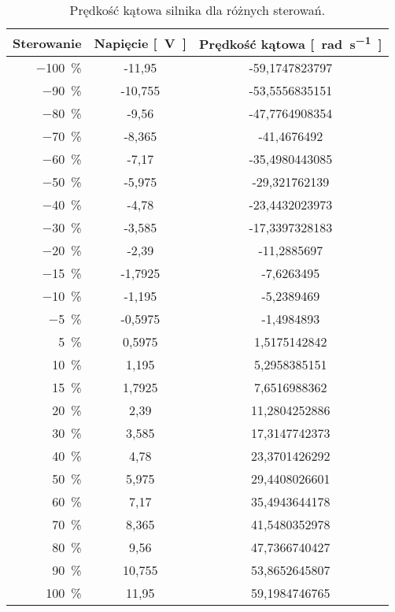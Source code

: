 \begin{table}[H]
    \centering
    \begin{threeparttable}
        \caption{Prędkość kątowa silnika dla różnych sterowań.}
        \label{tab:predkosc_silnika_rozne_sterowania}
        
        \begin{tabularx}{0.7\textwidth}{r | S[round-mode=places, round-precision=3] | S[round-mode=places, round-precision=2]}
            \toprule
            {Sterowanie} & {Napięcie \si{[\volt]}} & {Prędkość kątowa \si{[\radian\per\second]}} \\
            \midrule
            \SI{-100}{\percent} & -11,95 & -59,1747823797 \\
            \SI{-90}{\percent} & -10,755 & -53,5556835151 \\
            \SI{-80}{\percent} & -9,56 & -47,7764908354 \\
            \SI{-70}{\percent} & -8,365 & -41,4676492 \\
            \SI{-60}{\percent} & -7,17 & -35,4980443085 \\
            \SI{-50}{\percent} & -5,975 & -29,321762139 \\
            \SI{-40}{\percent} & -4,78 & -23,4432023973 \\
            \SI{-30}{\percent} & -3,585 & -17,3397328183 \\
            \SI{-20}{\percent} & -2,39 & -11,2885697 \\
            \SI{-15}{\percent} & -1,7925 & -7,6263495 \\
            \SI{-10}{\percent} & -1,195 & -5,2389469 \\
            \SI{-5}{\percent} & -0,5975 & -1,4984893 \\
            \SI{5}{\percent} & 0,5975 & 1,5175142842 \\
            \SI{10}{\percent} & 1,195 & 5,2958385151 \\
            \SI{15}{\percent} & 1,7925 & 7,6516988362 \\
            \SI{20}{\percent} & 2,39 & 11,2804252886 \\
            \SI{30}{\percent} & 3,585 & 17,3147742373 \\
            \SI{40}{\percent} & 4,78 & 23,3701426292 \\
            \SI{50}{\percent} & 5,975 & 29,4408026601 \\
            \SI{60}{\percent} & 7,17 & 35,4943644178 \\
            \SI{70}{\percent} & 8,365 & 41,5480352978 \\
            \SI{80}{\percent} & 9,56 & 47,7366740427 \\
            \SI{90}{\percent} & 10,755 & 53,8652645807 \\
            \SI{100}{\percent} & 11,95 & 59,1984746765 \\
            \bottomrule
        \end{tabularx}
        

\end{threeparttable}
\end{table}
